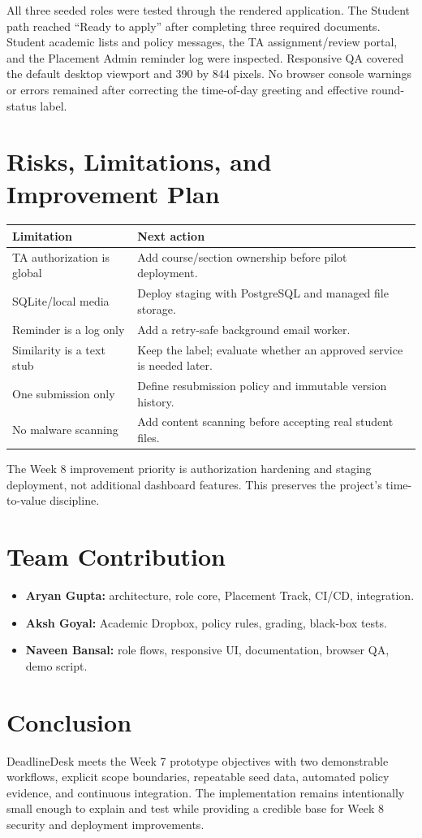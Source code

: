 \documentclass[11pt,a4paper]{article}
\begin{document}
All three seeded roles were tested through the rendered application. The Student path reached ``Ready to apply'' after completing three required documents. Student academic lists and policy messages, the TA assignment/review portal, and the Placement Admin reminder log were inspected. Responsive QA covered the default desktop viewport and 390 by 844 pixels. No browser console warnings or errors remained after correcting the time-of-day greeting and effective round-status label.

\section{Risks, Limitations, and Improvement Plan}

\begin{tabularx}{\textwidth}{@{}p{3.4cm}X@{}}
\toprule
\textbf{Limitation} & \textbf{Next action} \\
\midrule
TA authorization is global & Add course/section ownership before pilot deployment. \\
SQLite/local media & Deploy staging with PostgreSQL and managed file storage. \\
Reminder is a log only & Add a retry-safe background email worker. \\
Similarity is a text stub & Keep the label; evaluate whether an approved service is needed later. \\
One submission only & Define resubmission policy and immutable version history. \\
No malware scanning & Add content scanning before accepting real student files. \\
\bottomrule
\end{tabularx}

The Week 8 improvement priority is authorization hardening and staging deployment, not additional dashboard features. This preserves the project's time-to-value discipline.

\section{Team Contribution}

\begin{itemize}[leftmargin=0.7cm]
  \item \textbf{Aryan Gupta:} architecture, role core, Placement Track, CI/CD, integration.
  \item \textbf{Aksh Goyal:} Academic Dropbox, policy rules, grading, black-box tests.
  \item \textbf{Naveen Bansal:} role flows, responsive UI, documentation, browser QA, demo script.
\end{itemize}

\section{Conclusion}

DeadlineDesk meets the Week 7 prototype objectives with two demonstrable workflows, explicit scope boundaries, repeatable seed data, automated policy evidence, and continuous integration. The implementation remains intentionally small enough to explain and test while providing a credible base for Week 8 security and deployment improvements.
\end{document}
